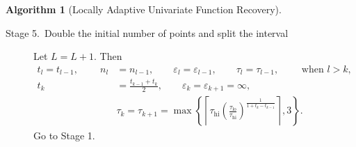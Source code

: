 \documentclass[]{elsarticle}
\DeclareMathOperator{\APP}{APP}
\DeclareMathOperator{\lo}{lo}
\newtheorem{theorem}{Theorem}
\theoremstyle{definition}
\newtheorem{algo}{Algorithm}
\theoremstyle{remark}
\begin{document}
\begin{algo}[Locally Adaptive Univariate Function Recovery]
\begin{description}
\item[Stage 5.\ Double the initial number of points and split the interval]
Let $L=L+1.$ Then
\begin{align*}
t_l=t_{l-1}, \qquad \ n_l&=n_{l-1}, \qquad \varepsilon_l=\varepsilon_{l-1}, \qquad \tau_l=\tau_{l-1}, \qquad \text{ when } l > k,\\
t_k&=\frac{t_{k-1}+t_k}{2}, \qquad \varepsilon_k=\varepsilon_{k+1}=\infty, \\
&  \tau_k=\tau_{k+1}=\max\left\{ \left\lceil \tau_{\text{hi}} \left(\frac{\tau_{\lo}}{\tau_{\text{hi}}}\right)^{\frac{1}{1+t_k-t_{k-1}}} \right\rceil ,3\right\}.
\end{align*}
Go to Stage 1.
\end{description}
\end{algo}

%
%
\end{document}
